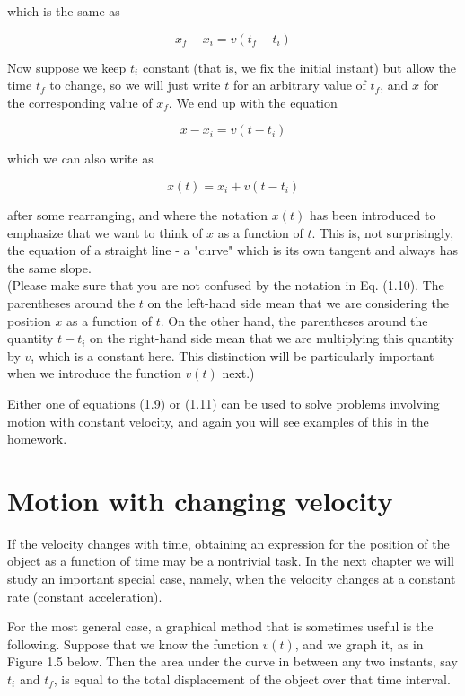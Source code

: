 \documentclass[10pt]{article}
\begin{document}
which is the same as

$$
x_{f}-x_{i}=v\left(t_{f}-t_{i}\right)
$$

Now suppose we keep $t_{i}$ constant (that is, we fix the initial instant) but allow the time $t_{f}$ to change, so we will just write $t$ for an arbitrary value of $t_{f}$, and $x$ for the corresponding value of $x_{f}$. We end up with the equation

$$
x-x_{i}=v\left(t-t_{i}\right)
$$

which we can also write as


\begin{equation*}
x(t)=x_{i}+v\left(t-t_{i}\right) \tag{1.10}
\end{equation*}


after some rearranging, and where the notation $x(t)$ has been introduced to emphasize that we want to think of $x$ as a function of $t$. This is, not surprisingly, the equation of a straight line - a "curve" which is its own tangent and always has the same slope.\\
(Please make sure that you are not confused by the notation in Eq. (1.10). The parentheses around the $t$ on the left-hand side mean that we are considering the position $x$ as a function of $t$. On the other hand, the parentheses around the quantity $t-t_{i}$ on the right-hand side mean that we are multiplying this quantity by $v$, which is a constant here. This distinction will be particularly important when we introduce the function $v(t)$ next.)

Either one of equations (1.9) or (1.11) can be used to solve problems involving motion with constant velocity, and again you will see examples of this in the homework.

\section*{Motion with changing velocity}
If the velocity changes with time, obtaining an expression for the position of the object as a function of time may be a nontrivial task. In the next chapter we will study an important special case, namely, when the velocity changes at a constant rate (constant acceleration).

For the most general case, a graphical method that is sometimes useful is the following. Suppose that we know the function $v(t)$, and we graph it, as in Figure 1.5 below. Then the area under the curve in between any two instants, say $t_{i}$ and $t_{f}$, is equal to the total displacement of the object over that time interval.
\end{document}
